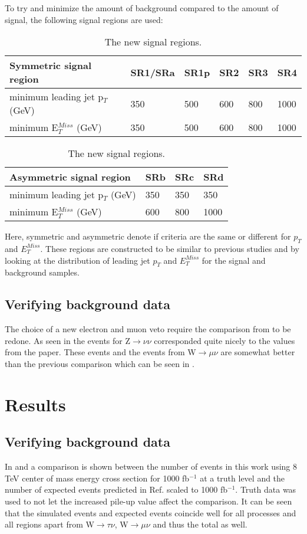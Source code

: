 To try and minimize the amount of background compared to the amount of signal, the following  signal regions are used:
\begin{table}[h]
\renewcommand{\arraystretch}{1.2} %
\begin{center}
\begin{tabular}{l l l l l l}
\hline
Symmetric signal region & SR1/SRa & SR1p & SR2 & SR3 & SR4 \\ \hline
minimum leading jet p$_T$ (GeV) & 350 &500& 600 & 800 & 1000 \\
minimum E$^{Miss}_T$ (GeV) & 350&500 & 600 & 800 & 1000 \\
\end{tabular}
\begin{tabular}{l l l l} \hline
Asymmetric signal region &  SRb & SRc & SRd \\ \hline
minimum leading jet p$_T$ (GeV) & 350 & 350 & 350 \\
minimum E$^{Miss}_T$ (GeV) & 600 & 800 & 1000 \\ \hline
\end{tabular}
\caption{The new signal regions.}
\label{tab:newsr}
\end{center}
\renewcommand{\arraystretch}{1.0} %
\end{table}

Here, symmetric and asymmetric denote if criteria are the same or different for $p_T$  and  $E^{Miss}_T$.
These regions are constructed to be similar to previous studies and by looking at the distribution of leading jet $p_T$  and  $E^{Miss}_T$ for the signal and background samples. 
\subsection{Verifying background data}
The choice of a new electron and muon veto require the comparison from  to be redone. As seen in  the events for Z$\rightarrow\nu\nu$  corresponded quite nicely to the values from the paper. These events and the events from W$\rightarrow \mu\nu$ are somewhat better than the previous comparison which can be seen in .

\newpage
\section{Results}\label{chap:sig:sec:res}
\subsection{Verifying background data}\label{Verifying background data}
In  and  a comparison is shown between the number of events in this work using 8 TeV center of mass energy cross section for 1000 fb$^{-1}$ at a truth level and the number of expected events predicted in Ref. \citep{ATLAS-CONF-2012-147} scaled to 1000 fb$^{-1}$. Truth data was used to not let the increased pile-up value affect the comparison. It can be seen that the simulated events and expected events coincide well for all processes and all regions apart from W$\rightarrow\tau\nu$, W$\rightarrow\mu\nu$ and thus the total as well. 

